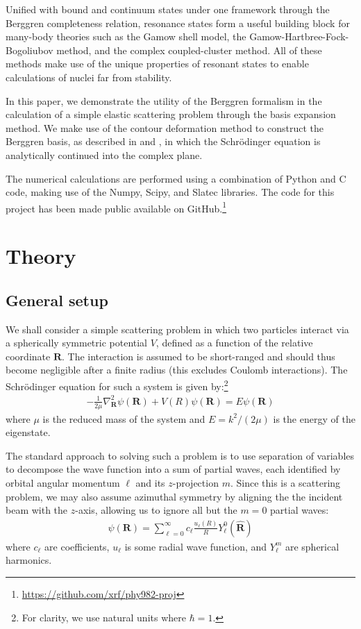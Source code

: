 \documentclass[amsmath, amssymb, aps, floatfix, nofootinbib, preprintnumbers,
  showpacs, superscriptaddress, twocolumn]{revtex4-1}
\begin{document}
Unified with bound and continuum states under one framework through the
Berggren completeness relation,\cite{Berggren1968} resonance states form a
useful building block for many-body theories such as the Gamow shell
model\cite{Hagen2006}, the Gamow-Hartbree-Fock-Bogoliubov
method,\cite{Michel2008} and the complex coupled-cluster
method.\cite{Hagen2007} All of these methods make use of the unique properties
of resonant states to enable calculations of nuclei far from stability.

In this paper, we demonstrate the utility of the Berggren formalism in the
calculation of a simple elastic scattering problem through the basis expansion
method.  We make use of the contour deformation method to construct the
Berggren basis, as described in \cite{Hagen2005} and \cite{Bengtsson2013}, in
which the Schr\"odinger equation is analytically continued into the complex
plane.

The numerical calculations are performed using a combination of Python and C
code, making use of the Numpy, Scipy, and Slatec libraries.  The code for this
project has been made public available on
GitHub.\footnote{\url{https://github.com/xrf/phy982-proj}}

\section{Theory}

\subsection{General setup}

We shall consider a simple scattering problem in which two particles interact
via a spherically symmetric potential $V$, defined as a function of the
relative coordinate $\bm R$.  The interaction is assumed to be short-ranged
and should thus become negligible after a finite radius (this excludes Coulomb
interactions).  The Schr\"odinger equation for such a system is given
by:\footnote{For clarity, we use natural units where $\hbar = 1$.}
\begin{align} \label{eq:0}
  -\frac{1}{2 \mu} \nabla_{\bm R}^2 \psi(\bm R) + V(R) \psi(\bm R) = E \psi(\bm R)
\end{align}
where $\mu$ is the reduced mass of the system and $E = k^2 / (2 \mu)$ is the
energy of the eigenstate.

The standard approach to solving such a problem is to use separation of
variables to decompose the wave function into a sum of partial waves, each
identified by orbital angular momentum $\ell$ and its $z$-projection $m$.
Since this is a scattering problem, we may also assume azimuthal symmetry by
aligning the the incident beam with the $z$-axis, allowing us to ignore all
but the $m = 0$ partial waves:
\begin{align*}
  \psi(\bm R) = \sum_{\ell = 0}^\infty c_{\ell} \frac{u_\ell(R)}{R} Y_\ell^0(\hat{\bm R})
\end{align*}
where $c_{\ell}$ are coefficients, $u_\ell$ is some radial wave function,
and $Y_\ell^m$ are spherical harmonics.
\end{document}
